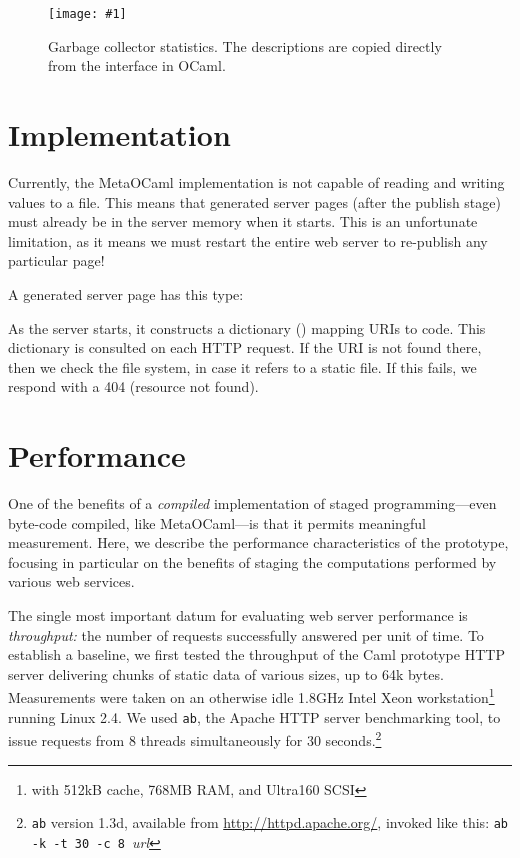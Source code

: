 \documentclass[preprint]{acm_proc_article-sp}
\def\MOC{MetaOCaml\xspace}
\newcommand{\myfig}[3]{%
  \begin{figure}[tbp]%
    #3%
    \caption{#2}%
    \label{fig:#1}%
  \end{figure}}
\newcommand{\screenshot}[2]{%
  \myfig{#1}{#2}
  {\centering%
    \texttt{[image: \#1]}}}
\begin{document}
\screenshot{gc}{Garbage collector statistics.  The descriptions are
  copied directly from the \id{gc.mli} interface in OCaml.}


\section{Implementation}
\label{sec:impl}


Currently, the \MOC{} implementation is not capable of reading
and writing  values to a file.  This means that
generated server pages (after the publish stage) must already be
in the server memory when it starts.  This is an unfortunate
limitation, as it means we must restart the entire web server to
re-publish any particular page!

A generated server page has this type:


As the server starts, it constructs a dictionary () mapping URIs to code.  This dictionary is
consulted on each HTTP request.  If the URI is not found there,
then we check the file system, in case it refers to a static
file.  If this fails, we respond with a 404 (resource not
found).


\section{Performance}
\label{sec:perf}

One of the benefits of a \emph{compiled} implementation of staged
programming---even byte-code compiled, like \MOC{}---is that it
permits meaningful measurement.  Here, we describe the performance
characteristics of the prototype, focusing in particular on the
benefits of staging the computations performed by various web
services.

The single most important datum for evaluating web server performance
is \textit{throughput:} the number of requests successfully answered
per unit of time.  To establish a baseline, we first tested the
throughput of the Caml prototype HTTP server delivering chunks of
static data of various sizes, up to 64k bytes.
Measurements were taken on an otherwise idle 1.8GHz Intel
Xeon\texttrademark{} workstation\footnote{with 512kB cache, 768MB RAM,
  and Ultra160 SCSI} running Linux 2.4.  We used \texttt{ab},
the Apache HTTP server benchmarking tool, to issue requests
from 8 threads simultaneously for 30 seconds.\footnote{\texttt{ab}
  version 1.3d, available from \url{http://httpd.apache.org/}, 
  invoked like this:
  \texttt{ab -k -t 30 -c 8 }\textit{url}}
\end{document}
